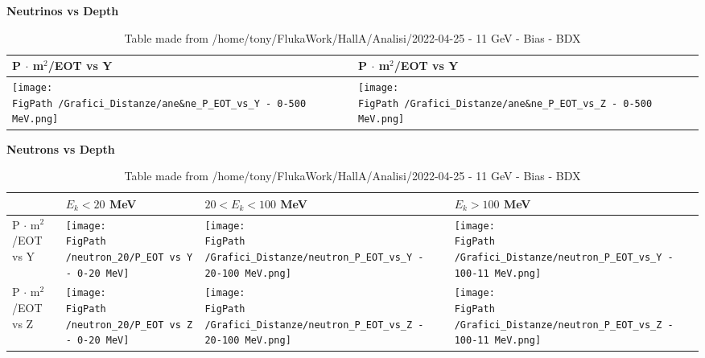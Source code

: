 \documentclass{article}
\def \FigPath {/home/tony/FlukaWork/HallA/Analisi/2022-04-25 - 11 GeV - Bias - BDX}
\begin{document}
\hspace{0pt}
\vfill

\begin{huge}
\begin{center}
\textbf{Neutrinos vs Depth}
\end{center}



\begin{table}[!htb]
\centering
\begin{tabular}{|l|l|}
\hline
P $\cdot$ m$^2$/EOT vs Y & P $\cdot$ m$^2$/EOT vs Y \\ \hline
 \texttt{[image: \\FigPath /Grafici\_Distanze/ane\&ne\_P\_EOT\_vs\_Y - 0-500 MeV.png]}
&\texttt{[image: \\FigPath /Grafici\_Distanze/ane\&ne\_P\_EOT\_vs\_Z - 0-500 MeV.png]} \\ \hline
\end{tabular}
\caption{Table made from \FigPath}
\end{table}

\begin{center}
\textbf{Neutrons vs Depth}
\end{center}


\begin{table}[!htb]
\centering
\begin{tabular}{|l|l|l|l|}
\hline
                                & $E_k < 20$ MeV & $20 < E_k < 100$ MeV & $E_k > 100$ MeV \\ \hline
P $\cdot$ m$^2$/EOT  vs Y 
  & \texttt{[image: \\FigPath /neutron\_20/P\_EOT vs Y - 0-20 MeV]}                  
  & \texttt{[image: \\FigPath /Grafici\_Distanze/neutron\_P\_EOT\_vs\_Y - 20-100 MeV.png]}                                 
  & \texttt{[image: \\FigPath /Grafici\_Distanze/neutron\_P\_EOT\_vs\_Y - 100-11 MeV.png]} \\ \hline
P $\cdot$ m$^2$/EOT  vs Z 
  & \texttt{[image: \\FigPath /neutron\_20/P\_EOT vs Z - 0-20 MeV]}                  
  & \texttt{[image: \\FigPath /Grafici\_Distanze/neutron\_P\_EOT\_vs\_Z - 20-100 MeV.png]}                                 
  & \texttt{[image: \\FigPath /Grafici\_Distanze/neutron\_P\_EOT\_vs\_Z - 100-11 MeV.png]} \\ \hline
\end{tabular}
\caption{Table made from \FigPath}
\end{table}

\vfill
\hspace{0pt}

\end{huge}
\end{document}

